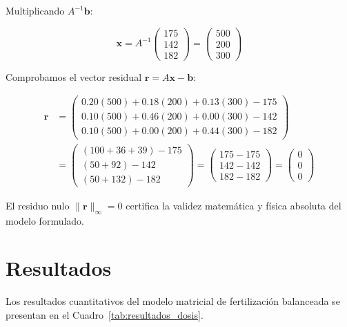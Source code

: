 Multiplicando $A^{-1}\mathbf{b}$:

\begin{equation}
\mathbf{x} = A^{-1} \begin{pmatrix} 175 \\ 142 \\ 182 \end{pmatrix} = \begin{pmatrix} 500 \\ 200 \\ 300 \end{pmatrix}
\end{equation}

Comprobamos el vector residual $\mathbf{r} = A\mathbf{x} - \mathbf{b}$:

\begin{equation}
\begin{aligned}
\mathbf{r} &=
\begin{pmatrix}
0.20(500) + 0.18(200) + 0.13(300) - 175 \\
0.10(500) + 0.46(200) + 0.00(300) - 142 \\
0.10(500) + 0.00(200) + 0.44(300) - 182
\end{pmatrix} \\
&=
\begin{pmatrix}
(100 + 36 + 39) - 175 \\
(50 + 92) - 142 \\
(50 + 132) - 182
\end{pmatrix}
=
\begin{pmatrix}
175 - 175 \\ 142 - 142 \\ 182 - 182
\end{pmatrix}
=
\begin{pmatrix} 0 \\ 0 \\ 0 \end{pmatrix}
\end{aligned}
\end{equation}

El residuo nulo $\|\mathbf{r}\|_\infty = 0$ certifica la validez matemática y física absoluta del modelo formulado.

\section{Resultados}

Los resultados cuantitativos del modelo matricial de fertilización balanceada se presentan en el Cuadro~\ref{tab:resultados_dosis}.

